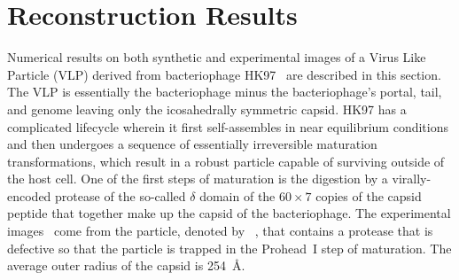 \section{Reconstruction Results}
\label{sec:results}
Numerical results on both synthetic and experimental images of a Virus Like
Particle (VLP) derived from bacteriophage
HK97~\cite{HendrixJohnson.HK97assemblymaturation.ExpMedBio.2012} are
described in this section.
The VLP is essentially the bacteriophage minus the bacteriophage's portal,
tail, and genome leaving only the icosahedrally symmetric capsid.
HK97 has a complicated lifecycle wherein it first self-assembles in near
equilibrium conditions and then undergoes a sequence of essentially
irreversible maturation transformations, which result in a robust particle
capable of surviving outside of the host cell.
One of the first steps of maturation is the digestion by a virally-encoded
protease of the so-called $\delta$ domain of the $60\times 7$ copies of the
capsid peptide that together make up the capsid of the bacteriophage.
The experimental
images~\cite{VeeslerKhayatKrishnamurthySnijderHuangHeckAnandJohnsonHK97Structure2014}
come from the particle, denoted by
{\withpro}~\cite{YunyeGongVeeslerDoerschukJohnsonJSB2016}, that contains a
protease that is defective so that the particle is trapped in the Prohead~I
step of maturation.
The average outer radius of the capsid is 254~{\AA}.
